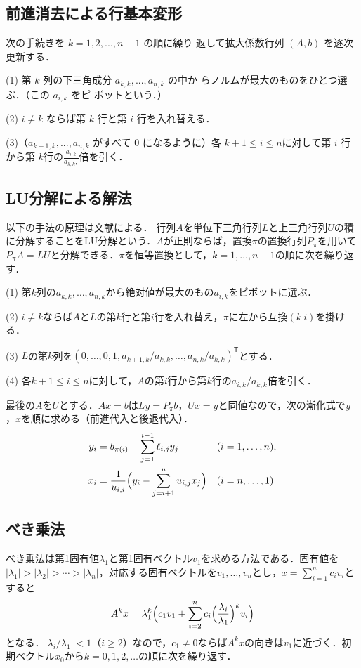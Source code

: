 \documentclass{jarticle}
\begin{document}
\subsection{前進消去による行基本変形}
次の手続きを $k = 1, 2, . . . , n-1$ の順に繰り
返して拡大係数行列 $(A, b)$ を逐次更新する．

(1) 第 $k$ 列の下三角成分 $a_{k,k}, ..., a_{n,k}$ の中か
らノルムが最大のものをひとつ選ぶ．（この $a_{i,k}$ をピ
ボットという．）

(2) $i \neq k$ ならば第 $k$ 行と第 $i$ 行を入れ替える．

(3)（$a_{k+1,k}, ... , a_{n,k}$ がすべて $0$ になるように）各 $k + 1 \leq i \leq n$に対して第 $i$ 行から第 $k$行の$\frac{a_{i,k}}{a_{k,k},}$倍を引く．

\subsection{LU分解による解法}
以下の手法の原理は文献\cite{text}による．
行列$A$を単位下三角行列$L$と上三角行列$U$の積に分解することをLU分解という．$A$が正則ならば，置換$\pi$の置換行列$P_\pi$を用いて$P_\pi A=LU$と分解できる．$\pi$を恒等置換として，$k=1,\ldots,n-1$の順に次を繰り返す．

(1) 第$k$列の$a_{k,k},\ldots,a_{n,k}$から絶対値が最大のもの$a_{i,k}$をピボットに選ぶ．

(2) $i\neq k$ならば$A$と$L$の第$k$行と第$i$行を入れ替え，$\pi$に左から互換$(k\ i)$を掛ける．

(3) $L$の第$k$列を$(0,\ldots,0,1,a_{k+1,k}/a_{k,k},\ldots,a_{n,k}/a_{k,k})^{\mathsf T}$とする．

(4) 各$k+1\leq i\leq n$に対して，$A$の第$i$行から第$k$行の$a_{i,k}/a_{k,k}$倍を引く．

最後の$A$を$U$とする．$Ax=b$は$Ly=P_\pi b$，$Ux=y$と同値なので，次の漸化式で$y$，$x$を順に求める（前進代入と後退代入）．
\begin{align*}
    y_i&=b_{\pi(i)}-\sum_{j=1}^{i-1}\ell_{i,j}y_j & (i&=1,\ldots,n),\\
    x_i&=\frac{1}{u_{i,i}}\Bigl(y_i-\sum_{j=i+1}^{n}u_{i,j}x_j\Bigr) & (i&=n,\ldots,1)
\end{align*}

\subsection{べき乗法}
べき乗法は第1固有値$\lambda_1$と第1固有ベクトル$v_1$を求める方法である．固有値を$|\lambda_1|>|\lambda_2|>\cdots>|\lambda_n|$，対応する固有ベクトルを$v_1,\ldots,v_n$とし，$x=\sum_{i=1}^{n}c_iv_i$とすると
\[
    A^kx=\lambda_1^k\Bigl(c_1v_1+\sum_{i=2}^{n}c_i\Bigl(\frac{\lambda_i}{\lambda_1}\Bigr)^kv_i\Bigr)
\]
となる．$|\lambda_i/\lambda_1|<1$（$i\geq2$）なので，$c_1\neq0$ならば$A^kx$の向きは$v_1$に近づく．初期ベクトル$x_0$から$k=0,1,2,\ldots$の順に次を繰り返す．
\end{document}

